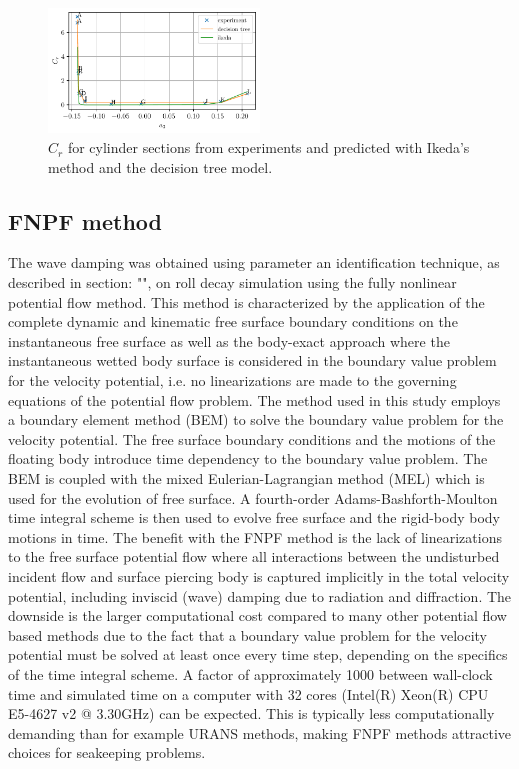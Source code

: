 \begin{figure}[H]
\begin{center}\includegraphics[width = 0.5\textwidth]{figures/ikeda_sections.pdf}\end{center}
\vspace{-1cm}
\caption{$C_r$ for cylinder sections from experiments and predicted with Ikeda's method and the decision tree model.}
\label{fig:ikeda_sections}
\end{figure}
\subsection*{FNPF method}\label{fnpf-method}
\label{fnpf-method} The wave damping was obtained using parameter an
identification technique, as described in section: "",
on roll decay simulation using the fully nonlinear potential flow
method. This method is characterized by the application of the complete
dynamic and kinematic free surface boundary conditions on the
instantaneous free surface as well as the body-exact approach where the
instantaneous wetted body surface is considered in the boundary value
problem for the velocity potential, i.e. no linearizations are made to
the governing equations of the potential flow problem.
\quad The method used in this study employs a boundary element method
(BEM) \citep{7505983/FD4N3DW2} to solve the boundary value problem for
the velocity potential.
\quad The free surface boundary conditions and the motions of the
floating body introduce time dependency to the boundary value problem.
The BEM is coupled with the mixed Eulerian-Lagrangian method (MEL)
\citep{7505983/ZKB494GT} which is used for the evolution of free surface.
A fourth-order Adams-Bashforth-Moulton time integral scheme is then used
to evolve free surface and the rigid-body body motions in time.
\quad The benefit with the FNPF method is the lack of linearizations to
the free surface potential flow where all interactions between the
undisturbed incident flow and surface piercing body is captured
implicitly in the total velocity potential, including inviscid (wave)
damping due to radiation and diffraction. The downside is the larger
computational cost compared to many other potential flow based methods
due to the fact that a boundary value problem for the velocity potential
must be solved at least once every time step, depending on the specifics
of the time integral scheme. A factor of approximately 1000 between
wall-clock time and simulated time on a computer with 32 cores (Intel(R)
Xeon(R) CPU E5-4627 v2 @ 3.30GHz) can be expected. This is typically
less computationally demanding than for example URANS methods, making
FNPF methods attractive choices for seakeeping problems.
